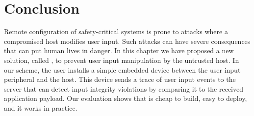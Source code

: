 
\section{Conclusion}
\label{sec:conclusion_IK}

Remote configuration of safety-critical systems is prone to attacks where a compromised host modifies user input. Such attacks can have severe consequences that can put human lives in danger. In this chapter we have proposed a new solution, called \name, to prevent user input manipulation by the untrusted host. In our scheme, the user installs a simple embedded device between the user input peripheral and the host. This device sends a trace of user input events to the server that can detect input integrity violations by comparing it to the received application payload. Our evaluation shows that \name is cheap to build, easy to deploy, and it works in practice.


